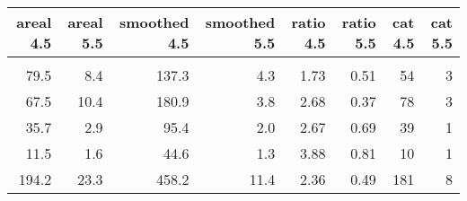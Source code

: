 \begin{tabular}{rrrrrrrr}
\toprule
 areal 4.5 &  areal 5.5 &  smoothed 4.5 &  smoothed 5.5 &  ratio 4.5 &  ratio 5.5 &  cat 4.5 &  cat 5.5 \\
\midrule
           &            &               &               &            &            &          &          \\
      79.5 &        8.4 &         137.3 &           4.3 &       1.73 &       0.51 &       54 &        3 \\
      67.5 &       10.4 &         180.9 &           3.8 &       2.68 &       0.37 &       78 &        3 \\
      35.7 &        2.9 &          95.4 &           2.0 &       2.67 &       0.69 &       39 &        1 \\
      11.5 &        1.6 &          44.6 &           1.3 &       3.88 &       0.81 &       10 &        1 \\
     194.2 &       23.3 &         458.2 &          11.4 &       2.36 &       0.49 &      181 &        8 \\
\bottomrule
\end{tabular}

